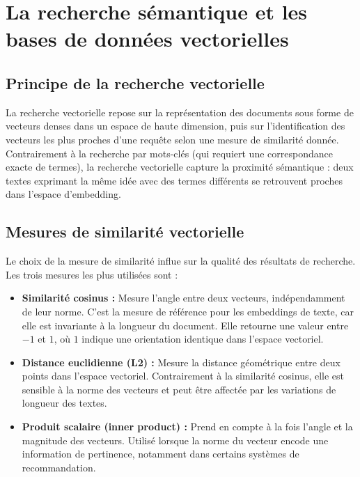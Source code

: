 \section{La recherche sémantique et les bases de données vectorielles}

\subsection{Principe de la recherche vectorielle}

La recherche vectorielle repose sur la représentation des documents sous forme de vecteurs denses dans un espace de haute dimension, puis sur l'identification des vecteurs les plus proches d'une requête selon une mesure de similarité donnée. Contrairement à la recherche par mots-clés (qui requiert une correspondance exacte de termes), la recherche vectorielle capture la proximité sémantique : deux textes exprimant la même idée avec des termes différents se retrouvent proches dans l'espace d'embedding.

\subsection{Mesures de similarité vectorielle}

Le choix de la mesure de similarité influe sur la qualité des résultats de recherche. Les trois mesures les plus utilisées sont :

\begin{itemize}
    \item \textbf{Similarité cosinus :} Mesure l'angle entre deux vecteurs, indépendamment de leur norme. C'est la mesure de référence pour les embeddings de texte, car elle est invariante à la longueur du document. Elle retourne une valeur entre $-1$ et $1$, où $1$ indique une orientation identique dans l'espace vectoriel.

    \item \textbf{Distance euclidienne (L2) :} Mesure la distance géométrique entre deux points dans l'espace vectoriel. Contrairement à la similarité cosinus, elle est sensible à la norme des vecteurs et peut être affectée par les variations de longueur des textes.

    \item \textbf{Produit scalaire (inner product) :} Prend en compte à la fois l'angle et la magnitude des vecteurs. Utilisé lorsque la norme du vecteur encode une information de pertinence, notamment dans certains systèmes de recommandation.
\end{itemize}

